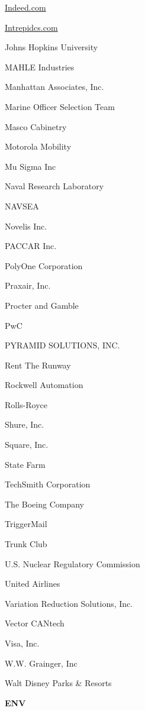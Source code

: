 \documentclass[twoside]{article}
\begin{document}
\begin{center}
\begin{multicols}{5}
\begin{FlushLeft}
\begin{compactitem}
\item \url{Indeed.com}
\item \url{Intrepidcs.com}
\item Johns Hopkins University
\item MAHLE Industries
\item Manhattan Associates, Inc.
\item Marine Officer Selection Team
\item Masco Cabinetry
\item Motorola Mobility
\item Mu Sigma Inc
\item Naval Research Laboratory
\item NAVSEA
\item Novelis Inc.
\item PACCAR Inc.
\item PolyOne Corporation
\item Praxair, Inc.
\item Procter and Gamble
\item PwC
\item PYRAMID SOLUTIONS, INC.
\item Rent The Runway
\item Rockwell Automation
\item Rolls-Royce
\item Shure, Inc.
\item Square, Inc.
\item State Farm
\item TechSmith Corporation
\item The Boeing Company
\item TriggerMail
\item Trunk Club
\item U.S. Nuclear Regulatory Commission
\item United Airlines
\item Variation Reduction Solutions, Inc.
\item Vector CANtech
\item Visa, Inc.
\item W.W. Grainger, Inc
\item Walt Disney Parks \& Resorts
\end{compactitem}
        \end{FlushLeft}
        \vspace{1em}
        {\fontsize{14}{16}\selectfont \bf ENV}\\
        \vspace{-1em}
        ~\hrulefill~
        \vspace{-.9em}

\end{multicols}
\end{center}
\end{document}
